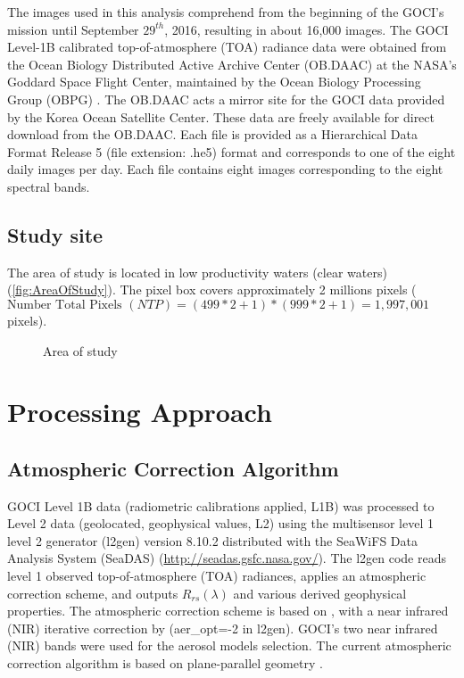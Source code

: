 \documentclass[onecolumn,3p,letterpaper,11pt]{elsarticle}
\begin{document}
The images used in this analysis comprehend from the beginning of the GOCI's mission until September $29^{th}$, 2016, resulting in about 16,000 images. The GOCI Level-1B calibrated top-of-atmosphere (TOA) radiance data were obtained from the Ocean Biology Distributed Active Archive Center (OB.DAAC) at the NASA's Goddard Space Flight Center, maintained by the Ocean Biology Processing Group (OBPG) . The OB.DAAC acts a mirror site for the GOCI data provided by the Korea Ocean Satellite Center. These data are freely available for direct download from the OB.DAAC. Each file is provided as a  Hierarchical Data Format Release 5 (file extension: .he5) format and corresponds to one of the eight daily images per day. Each file contains eight images corresponding to the eight spectral bands.
\subsection{Study site}

The area of study is located in low productivity waters (clear waters)(\autoref{fig:AreaOfStudy}). The pixel box covers approximately 2 millions pixels ($\text{Number Total Pixels } (NTP) = (499*2+1)*(999*2+1) =  1,997,001$ pixels).

\begin{figure}[ht]
	\centering
	\caption{Area of study}
	\label{fig:AreaOfStudy}
\end{figure}
\section{Processing Approach}
\subsection{Atmospheric Correction Algorithm}
GOCI Level 1B data (radiometric calibrations applied, L1B) was processed to Level 2 data (geolocated, geophysical values, L2) using the multisensor level 1 level 2 generator (l2gen) version 8.10.2 distributed with the SeaWiFS Data Analysis System (SeaDAS) (\url{http://seadas.gsfc.nasa.gov/}). The l2gen code reads level 1 observed top-of-atmosphere (TOA) radiances, applies an atmospheric correction scheme, and outputs $R_{rs}(\lambda)$ and various derived geophysical properties. The atmospheric correction scheme is based on \citet{Gordon1994}, with a near infrared (NIR) iterative correction by \citet{Bailey2010} ({\ttfamily aer\_opt=-2} in l2gen). GOCI's two near infrared (NIR) bands were used for the aerosol models selection. The current atmospheric correction algorithm is based on plane-parallel geometry \citep{Gordon1994}. 
\end{document}
